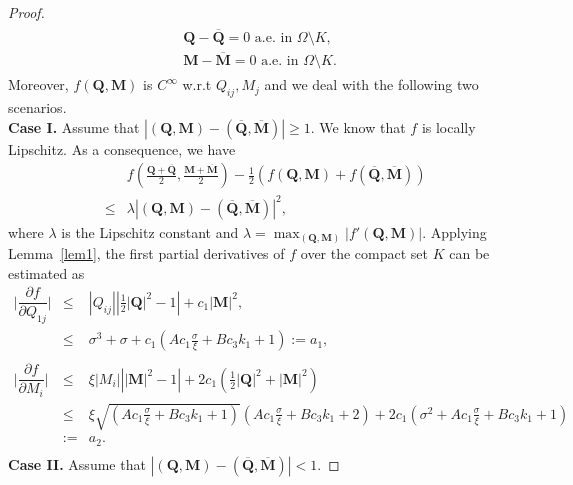 \documentclass[10pt,a4paper]{amsart}
\def \Mvec{\mathbf{M}}
\def\Qvec{\mathbf{Q}}
\begin{document}
\begin{proof}
\begin{eqnarray}
\begin{aligned}
\Qvec-\overline{\Qvec}=0 \mbox{ a.e. in } \Omega\setminus K,\label{eq:tay}\\
\Mvec-\overline{\Mvec}=0 \mbox{ a.e. in } \Omega\setminus K.
\end{aligned}
\end{eqnarray}
Moreover, $f\left(\Qvec, \Mvec\right)$ is $C^{\infty}$ w.r.t $Q_{ij}, M_j$ and we deal with the following two scenarios.\newline\\
\textbf{Case I.} Assume that $|\left(\Qvec, \Mvec\right)-\left(\overline{\Qvec}, \overline{\Mvec}\right)|\geq 1$. We know that $f$ is locally Lipschitz. As a consequence, we have
\begin{eqnarray}
& &f\left(\frac{\Qvec+\overline{\Qvec}}{2}, \frac{\Mvec+\overline{\Mvec}}{2}\right)-\frac{1}{2}\left(f\left(\Qvec, \Mvec\right) + f\left(\overline{\Qvec}, \overline{\Mvec}\right)\right)\nonumber\\
&\le&\lambda|\left(\Qvec, \Mvec\right)-\left(\overline{\Qvec}, \overline{\Mvec}\right)|^2,\label{eq:case1}
\end{eqnarray}
where $\lambda$ is the Lipschitz constant and $\lambda=\max_{\left(\Qvec, \Mvec\right)}|f'\left(\Qvec, \Mvec\right)|$. Applying Lemma~\ref{lem1}, the first partial derivatives of $f$ over the compact set $K$ can be estimated as 
\begin{eqnarray}
\Big|\dfrac{\partial f}{\partial Q_{1j}}\Big|&\le&|Q_{ij}|\left|\tfrac12|\Qvec|^2-1\right|+c_1|\Mvec|^2,\nonumber\\
&\le& \sigma^3 + \sigma + c_1\left(A c_1 \frac{\sigma}{\xi} + Bc_3k_1 + 1\right):=a_1,\nonumber\\
\label{eq:first_de1}\\
\Big|\dfrac{\partial f}{\partial M_{i}}\Big|&\le&\xi|M_i|\left||\Mvec|^2-1\right|+2c_1\left(\tfrac12|\Qvec|^2+|\Mvec|^2\right)\nonumber\\
&\le&\xi\sqrt{\left(A c_1 \frac{\sigma}{\xi} + Bc_3k_1 + 1\right)}\left(A c_1 \frac{\sigma}{\xi} + Bc_3k_1 + 2\right)+2c_1\left(\sigma^2+ A c_1 \frac{\sigma}{\xi} + Bc_3k_1  + 1\right)\nonumber\\
&:=&a_2.\nonumber\\
\label{eq:first_de2}
\end{eqnarray}
\textbf{Case II.} Assume that $|\left(\Qvec, \Mvec\right)-\left(\overline{\Qvec}, \overline{\Mvec}\right)| < 1$.\newline

\end{proof}
\end{document}
